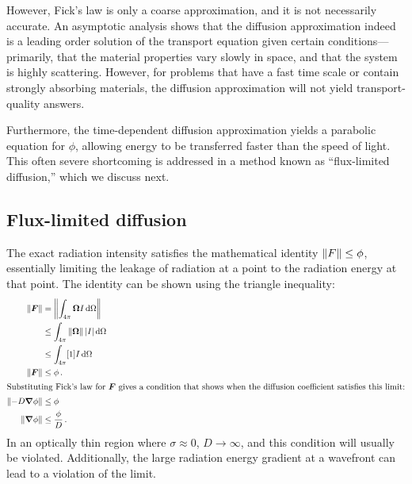 However, Fick's law is only a coarse approximation, and it is not
necessarily accurate. An asymptotic analysis \cite{Lar1975,Lar1983a} shows that
the diffusion approximation indeed is a leading
order solution of the transport equation given certain conditions---%
primarily, that the material properties vary slowly in space, and that the
system is highly scattering. However, for problems that have a fast time scale
or contain strongly absorbing materials, the diffusion approximation will not
yield transport-quality answers.

Furthermore, the time-dependent diffusion approximation yields a parabolic equation
for $\phi$, allowing energy to be transferred faster than the speed of light. This
often severe shortcoming is addressed in a method known as ``flux-limited
diffusion,'' which we discuss next.

\subsection{Flux-limited diffusion}\label{sec:bgFld}

The exact radiation intensity satisfies the mathematical identity $\left\| F \right\| \le
\phi$,
essentially limiting the leakage of radiation at a point to the radiation
energy at that point. The identity can be shown using the triangle inequality:
\begin{align}
  \left\| \bm{F} \right\| &= \left\|  \int_{4\pi} \bm{\Omega} I \mathop{}\!\mathrm{d} \Omega \right\|
  \\ \nonumber
  &\le \int_{4\pi} \left\| \bm{\Omega} \right\| \left| I \right| \mathop{}\!\mathrm{d} \Omega 
  \\ \nonumber
  &\le \int_{4\pi} [1] I \mathop{}\!\mathrm{d}\Omega
  \\ \nonumber
  \left\| \bm{F} \right\| &\le \phi\,.
  \\ 
  \intertext{Substituting Fick's law for $\bm{F}$ gives a condition that
  shows when the
  diffusion coefficient satisfies this limit:} \nonumber
  \left\| - D \bm{\nabla} \phi \right\| &\le \phi
  \\ \label{eq:fluxLimit}
  \left\| \bm{\nabla} \phi \right\| & \le \frac{\phi}{D} \,.
\end{align}
In an optically thin region where $\sigma\approx 0$, $D\to\infty$, and this condition
will usually be violated. Additionally, the large radiation energy gradient at a
wavefront can lead to a violation of the limit.

